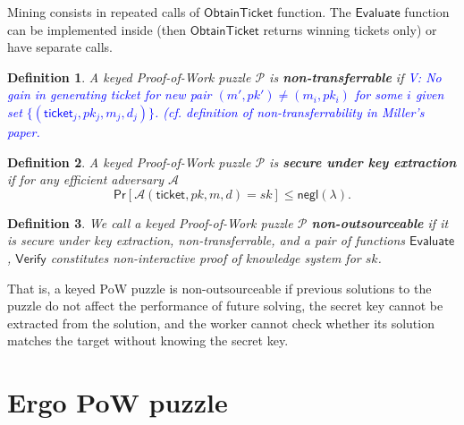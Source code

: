 \documentclass[]{article}
\newcommand{\vk}[1]{\textcolor{blue}{V: {#1}}}
\newcommand{\Ticket}{\mathsf{ticket}}
\newcommand{\Eval}{\mathsf{Evaluate}}
\newcommand{\Verify}{\mathsf{Verify}}
\newcommand{\ObtainTicket}{\mathsf{ObtainTicket}}
\newtheorem{definition}{Definition}
\begin{document}
    Mining consists in repeated calls of $\ObtainTicket$ function.
    The $\Eval$ function can be implemented inside (then $\ObtainTicket$
    returns winning tickets only) or have separate calls.

    \begin{definition}
        A keyed Proof-of-Work puzzle $\mathcal{P}$ is {\bf non-transferrable} if
        \vk{No gain in generating ticket for new pair $(m',pk')\ne (m_i,pk_i)$
            for some $i$ given set $\{(\Ticket_j, pk_j, m_j, d_j)\}$. (cf.
            definition of non-transferrability in Miller's paper.}
    \end{definition}

    \begin{definition}
        A keyed Proof-of-Work puzzle $\mathcal{P}$ is {\bf secure under key
        extraction} if for any efficient adversary $\mathcal{A}$
        \begin{equation}
            \mathsf{Pr}[\mathcal{A}(\Ticket,pk,m,d)=sk]\le\mathsf{negl}(\lambda).
        \end{equation}
    \end{definition}

    \begin{definition}
        We call a keyed Proof-of-Work puzzle $\mathcal{P}$ {\bf
        non-outsourceable} if it is secure under key extraction,
        non-transferrable, and a pair of functions $\Eval$, $\Verify$
        constitutes non-interactive proof of knowledge system for $sk$.
    \end{definition}

    That is, a keyed PoW puzzle is non-outsourceable if previous solutions to
    the puzzle do not affect the performance of future solving, the secret key
    cannot be extracted from the solution, and the worker cannot check
    whether its solution matches the target without knowing the secret key.

    \section{Ergo PoW puzzle}
    \label{puzzle}
\end{document}

